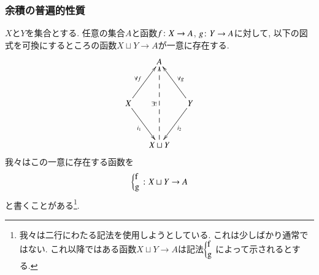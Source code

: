 
\subsubsection{余積の普遍的性質}

\begin{lemma}\label{lemma:up for coprod}


$X$と$Y$を集合とする. 任意の集合$A$と函数$f\colon X\rightarrow A$, $g\colon Y\rightarrow A$に対して, 以下の図式を可換にするところの函数$X\sqcup Y\to A$が一意に存在する.
$$
\xymatrix@=15pt{&A\\\\X\ar[uur]^{\forall f}\ar[ddr]_{i_1}&&Y\ar[uul]_{\forall g}\ar[ddl]^{i_2}\\\\&X\sqcup Y\ar@{-->}[uuuu]^{\exists!}}
$$
我々はこの一意に存在する函数を
$$\coprodmap{f}{g}\taking X\sqcup Y\to A$$
と書くことがある\footnote{我々は二行にわたる記法を使用しようとしている. これは少しばかり通常ではない. これ以降ではある函数$X\sqcup Y\to A$は記法$\coprodmap{f}{g}$によって示されるとする.}.
\end{lemma}

